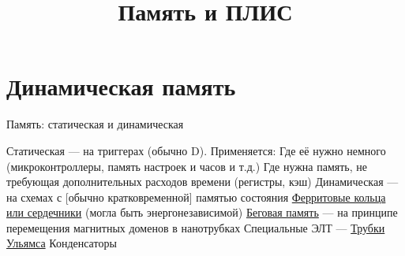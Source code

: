 \documentclass[xetex,aspectratio=43]{beamer}
\title{Память и ПЛИС}
\begin{document}
    \titleslide

    \tocslide

\section{Динамическая память}

\begin{frame}{Память: статическая и динамическая}
    \begin{outline}[itemize]
        \1 Статическая --- на триггерах (обычно D). Применяется:
            \2 Где её нужно немного (микроконтроллеры, память настроек и часов и т.д.)
            \2 Где нужна память, не требующая дополнительных расходов времени (регистры, кэш)
        \1 Динамическая --- на схемах с [обычно кратковременной] памятью состояния
            \2 \href{https://en.wikipedia.org/wiki/Magnetic-core_memory}{Ферритовые кольца или сердечники} (могла быть энергонезависимой)
            \2 \href{https://en.wikipedia.org/wiki/Racetrack_memory}{Беговая память} --- на принципе перемещения магнитных доменов в нанотрубках
            \2 Специальные ЭЛТ --- \href{https://en.wikipedia.org/wiki/Williams_tube}{Трубки Ульямса}
            \2 Конденсаторы
    \end{outline}
\end{frame}
\end{document}
